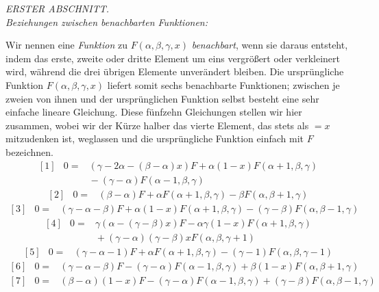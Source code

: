 \par{}
\begin{center}\textit{ERSTER ABSCHNITT.}\\[4pt]
\textit{Beziehungen zwischen benachbarten Funktionen:}\end{center}
Wir nennen eine \textit{Funktion} zu $F(\alpha,\beta,\gamma,x)$ \textit{benachbart}, wenn sie daraus entsteht, indem das erste, zweite oder dritte Element um eins vergrößert oder verkleinert wird, während die drei übrigen Elemente unverändert bleiben. Die ursprüngliche Funktion $F(\alpha,\beta,\gamma,x)$ liefert somit sechs benachbarte Funktionen; zwischen je zweien von ihnen und der ursprünglichen Funktion selbst besteht eine sehr einfache lineare Gleichung. Diese fünfzehn Gleichungen stellen wir hier zusammen, wobei wir der Kürze halber das vierte Element, das stets als $=x$ mitzudenken ist, weglassen und die ursprüngliche Funktion einfach mit $F$ bezeichnen.
\[
\begin{array}{rcl}
{[1]}&0=&(\gamma-2\alpha-(\beta-\alpha)x)F+\alpha(1-x)F(\alpha+1,\beta,\gamma)\\
&&{}-(\gamma-\alpha)F(\alpha-1,\beta,\gamma)
\end{array}
\]
\[
\begin{array}{rcl}
{[2]}&0=&(\beta-\alpha)F+\alpha F(\alpha+1,\beta,\gamma)-\beta F(\alpha,\beta+1,\gamma)
\end{array}
\]
\[
\begin{array}{rcl}
{[3]}&0=&(\gamma-\alpha-\beta)F+\alpha(1-x)F(\alpha+1,\beta,\gamma)-(\gamma-\beta)F(\alpha,\beta-1,\gamma)
\end{array}
\]
\[
\begin{array}{rcl}
{[4]}&0=&\gamma(\alpha-(\gamma-\beta)x)F-\alpha\gamma(1-x)F(\alpha+1,\beta,\gamma)\\
&&{}+(\gamma-\alpha)(\gamma-\beta)xF(\alpha,\beta,\gamma+1)
\end{array}
\]
\[
\begin{array}{rcl}
{[5]}&0=&(\gamma-\alpha-1)F+\alpha F(\alpha+1,\beta,\gamma)-(\gamma-1)F(\alpha,\beta,\gamma-1)
\end{array}
\]
\[
\begin{array}{rcl}
{[6]}&0=&(\gamma-\alpha-\beta)F-(\gamma-\alpha)F(\alpha-1,\beta,\gamma)+\beta(1-x)F(\alpha,\beta+1,\gamma)
\end{array}
\]
\[
\begin{array}{rcl}
{[7]}&0=&(\beta-\alpha)(1-x)F-(\gamma-\alpha)F(\alpha-1,\beta,\gamma)+(\gamma-\beta)F(\alpha,\beta-1,\gamma)
\end{array}
\]
